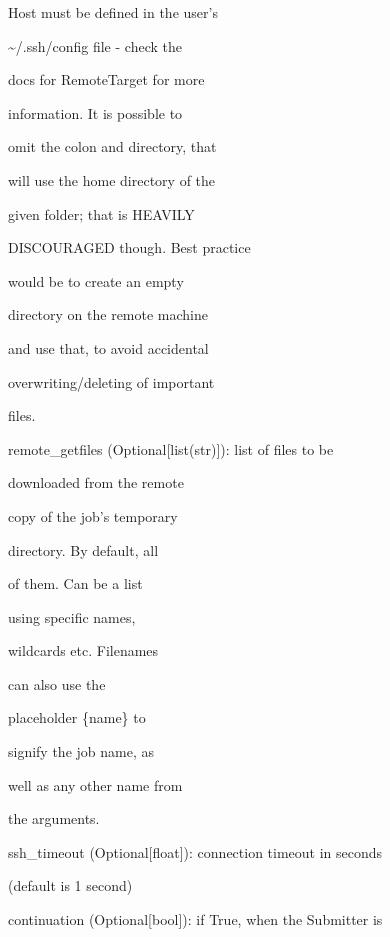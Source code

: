 \documentclass[letterpaper,10pt,english]{sphinxmanual}
\begin{document}
\begin{fulllineitems}
\begin{DUlineblock}{0em}
\begin{DUlineblock}{\DUlineblockindent}
\begin{DUlineblock}{\DUlineblockindent}
\item[] Host must be defined in the user's
\item[] \textasciitilde{}/.ssh/config file - check the
\item[] docs for RemoteTarget for more
\item[] information. It is possible to
\item[] omit the colon and directory, that
\item[] will use the home directory of the
\item[] given folder; that is HEAVILY
\item[] DISCOURAGED though. Best practice
\item[] would be to create an empty
\item[] directory on the remote machine
\item[] and use that, to avoid accidental
\item[] overwriting/deleting of important
\item[] files.
\end{DUlineblock}
\item[] remote\_getfiles (Optional{[}list(str){]}): list of files to be
\item[]
\begin{DUlineblock}{\DUlineblockindent}
\item[] downloaded from the remote
\item[] copy of the job's temporary
\item[] directory. By default, all
\item[] of them. Can be a list
\item[] using specific names,
\item[] wildcards etc. Filenames
\item[] can also use the
\item[] placeholder \{name\} to
\item[] signify the job name, as
\item[] well as any other name from
\item[] the arguments.
\end{DUlineblock}
\item[] ssh\_timeout (Optional{[}float{]}): connection timeout in seconds
\item[]
\begin{DUlineblock}{\DUlineblockindent}
\item[] (default is 1 second)
\end{DUlineblock}
\item[] continuation (Optional{[}bool{]}): if True, when the Submitter is

\end{DUlineblock}
\end{DUlineblock}
\end{fulllineitems}
\end{document}
